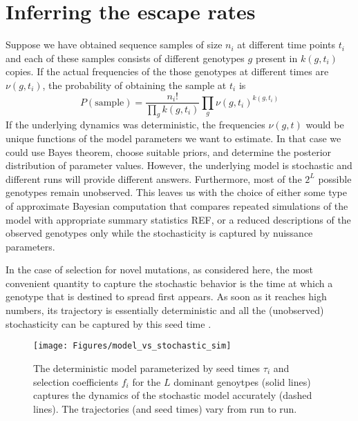 \documentclass[rmp,twocolumn]{revtex4}
\newcommand{\gt}{g}
\newcommand{\fcoeff}{f}
\begin{document}
\section*{Inferring the escape rates}
Suppose we have obtained sequence samples of size $n_i$ at different time points
$t_i$ and each of these samples consists of different genotypes $\gt$ present in
$k(\gt,t_i)$ copies. If the actual frequencies of the those genotypes at
different times are $\nu(\gt,t_i)$, the probability of obtaining the sample at
$t_i$ is
\begin{equation}
P(\mathrm{sample}) = \frac{n_i!}{\prod_\gt
k(\gt,t_i)}\prod_{\gt}\nu(\gt,t_i)^{k(\gt,t_i)}
\end{equation}
If the underlying dynamics was deterministic, the frequencies $\nu(\gt,t)$
would be unique functions of the model parameters we want to estimate. In that
case we could use Bayes theorem, choose suitable priors, and determine the
posterior distribution of parameter values. However, the underlying model is stochastic and different
runs will provide different answers. Furthermore, most of the $2^L$ possible
genotypes remain unobserved. This leaves us with the choice of either
some type of approximate Bayesian computation that compares repeated simulations
of the model with appropriate summary statistics REF, or a reduced descriptions
of the observed genotypes only while the stochasticity is captured by nuissance
parameters.

In the case of selection for novel mutations, as considered here, the most
convenient quantity to capture the stochastic behavior is the time at which a
genotype that is destined to spread first appears. As soon as it reaches high
numbers, its trajectory is essentially deterministic and all the (unobserved) 
stochasticity can be captured by this seed time
\citep{Kepler:1995p26819,Desai:2007p954}.

\begin{figure}[htp]
\begin{center}
  \texttt{[image: Figures/model\_vs\_stochastic\_sim]}
  \caption[labelInTOC]{The deterministic model parameterized by seed times
  $\tau_i$ and selection coefficients $\fcoeff_i$ for the $L$ dominant genoytpes
  (solid lines) captures the dynamics of the stochastic model accurately
  (dashed lines). The trajectories (and seed times) vary from run to run.}
  \label{fig:model_vs_full}
\end{center}
\end{figure}
\end{document}
